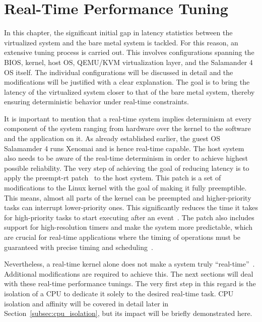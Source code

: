 \documentclass[MMR,Master,english]{twbook}
\begin{document}
\clearpage

\chapter{Real-Time Performance Tuning}\label{cha:real-time_tuning}

In this chapter, the significant initial gap in latency statistics between the virtualized system and the bare metal system is tackled. For this reason, an extensive tuning process is carried out. This involves configurations spanning the BIOS, kernel, host OS, QEMU/KVM virtualization layer, and the Salamander 4 OS itself. The individual configurations will be discussed in detail and the modifications will be justified with a clear explanation. The goal is to bring the latency of the virtualized system closer to that of the bare metal system, thereby ensuring deterministic behavior under real-time constraints.

\bigskip \noindent It is important to mention that a real-time system implies determinism at every component of the system ranging from hardware over the kernel to the software and the application on it. As already established earlier, the guest OS Salamamder 4 runs Xenomai and is hence real-time capable. The host system also needs to be aware of the real-time determinism in order to achieve highest possible reliability. The very step of achieving the goal of reducing latency is to apply the preempt-rt patch~\cite{RealtimePreempt_rt_versionsWiki} to the host system. This patch is a set of modifications to the Linux kernel with the goal of making it fully preemptible. This means, almost all parts of the kernel can be preempted and higher-priority tasks can interrupt lower-priority ones. This significantly reduces the time it takes for high-priority tasks to start executing after an event~\cite{RealtimeKernelPatchset}. The patch also includes support for high-resolution timers and make the system more predictable, which are crucial for real-time applications where the timing of operations must be guaranteed with precise timing and scheduling~\cite{rostedtInternalsRTPatch}.

\bigskip \noindent Nevertheless, a real-time kernel alone does not make a system truly “real-time”~\cite{WhatRealtimeLinux}. Additional modifications are required to achieve this. The next sections will deal with these real-time performance tunings. The very first step in this regard is the isolation of a CPU to dedicate it solely to the desired real-time task. CPU isolation and affinity will be covered in detail later in Section~\ref{subsec:cpu_isolation}, but its impact will be briefly demonstrated here.
\end{document}
